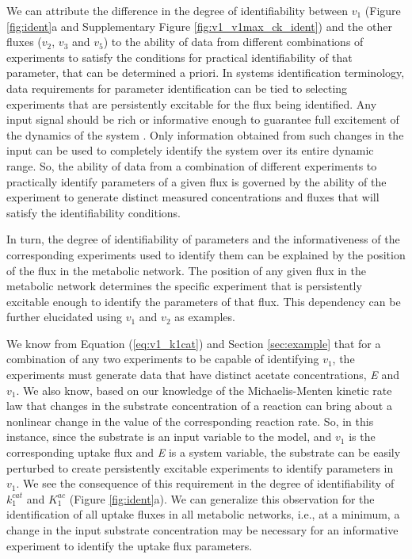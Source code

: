 \documentclass[10pt]{article}
\begin{document}
	We can attribute the difference in the degree of identifiability between $v_1$ (Figure \ref{fig:ident}a and Supplementary Figure \ref{fig:v1_v1max_ck_ident}) and the other fluxes ($v_2$, $v_3$ and $v_5$) to the ability of data from different combinations of experiments to satisfy the conditions for practical identifiability of that parameter, that can be determined a priori. In systems identification terminology, data requirements for parameter identification can be tied to selecting experiments that are persistently excitable for the flux being identified. Any input signal should be rich or informative enough to guarantee full excitement of the dynamics of the system \parencite{Ljung1994}. Only information obtained from such changes in the input can be used to completely identify the system over its entire dynamic range. So, the ability of data from a combination of different experiments to practically identify parameters of a given flux is governed by the ability of the experiment to generate distinct measured concentrations and fluxes that will satisfy the identifiability conditions. 	
	
	In turn, the degree of identifiability of parameters and the informativeness of the corresponding experiments used to identify them can be explained by the position of the flux in the metabolic network. The position of any given flux in the metabolic network determines the specific experiment that is persistently excitable enough to identify the parameters of that flux. This dependency can be further elucidated using $v_1$ and $v_2$ as examples. 
	
	We know from Equation (\ref{eq:v1_k1cat}) and Section \ref{sec:example} that for a combination of any two experiments to be capable of identifying $v_1$, the experiments must generate data that have distinct acetate concentrations, \textit{E} and $v_1$. We also know, based on our knowledge of the Michaelis-Menten kinetic rate law that changes in the substrate concentration of a reaction can bring about a nonlinear change in the value of the corresponding reaction rate. So, in this instance, since the substrate is an input variable to the model, and $v_1$ is the corresponding uptake flux and \textit{E} is a system variable, the substrate can be easily perturbed to create persistently excitable experiments to identify parameters in $v_1$. We see the consequence of this requirement in the degree of identifiability of $k_1^{cat}$ and $K_1^{ac}$ (Figure \ref{fig:ident}a). We can generalize this observation for the identification of all uptake fluxes in all metabolic networks, i.e., at a minimum, a change in the input substrate concentration may be necessary for an informative experiment to identify the uptake flux parameters. 
	
\end{document}
